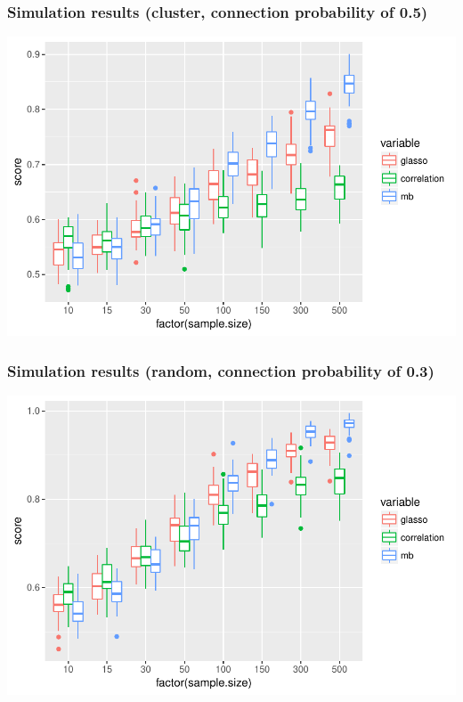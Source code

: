 \documentclass[10pt, c, xcolor=x11names]{beamer}\usepackage[]{graphicx}\usepackage[]{color}
\newenvironment{knitrout}{}{} %
\begin{document}
\begin{frame}[fragile]
  \frametitle{Simulation results (cluster, connection probability of 0.5)}

\begin{knitrout}\scriptsize
{}\color{fgcolor}
\includegraphics[width=.8\textwidth]{figures/r_plot_simu_cluster2-1} 

\end{knitrout}



\end{frame}

\begin{frame}[fragile]
  \frametitle{Simulation results (random, connection probability of 0.3)}

\begin{knitrout}\scriptsize
{}\color{fgcolor}
\includegraphics[width=.8\textwidth]{figures/r_plot_simu_random-1} 

\end{knitrout}

\end{frame}
\end{document}
